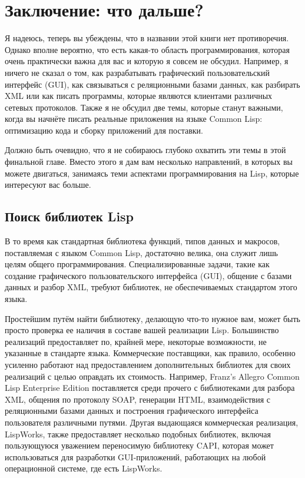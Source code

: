 \chapter{Заключение: что дальше?}
\label{ch:32}

\thispagestyle{empty}

Я надеюсь, теперь вы убеждены, что в названии этой книги нет противоречия.  Однако вполне
вероятно, что есть какая-то область программирования, которая очень практически важна для
вас и которую я совсем не обсудил. Например, я ничего не сказал о том, как разрабатывать
графический пользовательский интерфейс (GUI), как связываться с реляционными базами
данных, как разбирать XML или как писать программы, которые являются клиентами различных
сетевых протоколов. Также я не обсудил две темы, которые станут важными, когда вы начнёте
писать реальные приложения на языке Common Lisp: оптимизацию кода и сборку приложений для
поставки.

Должно быть очевидно, что я не собираюсь глубоко охватить эти темы в этой финальной
главе. Вместо этого я дам вам несколько направлений, в которых вы можете двигаться,
занимаясь теми аспектами программирования на Lisp, которые интересуют вас больше.

\section{Поиск библиотек Lisp}

В то время как стандартная библиотека функций, типов данных и макросов, поставляемая с
языком Common Lisp, достаточно велика, она служит лишь целям общего
программирования. Специализированные задачи, такие как создание графического
пользовательского интерфейса (GUI), общение с базами данных и разбор XML, требуют
библиотек, не обеспечиваемых стандартом этого языка.

Простейшим путём найти библиотеку, делающую что-то нужное вам, может быть просто проверка
ее наличия в составе вашей реализации Lisp. Большинство реализаций предоставляет по,
крайней мере, некоторые возможности, не указанные в стандарте языка. Коммерческие
поставщики, как правило, особенно усиленно работают над предоставлением дополнительных
библиотек для своих реализаций с целью оправдать их стоимость. Например, Franz's Allegro
Common Lisp Enterprise Edition поставляется среди прочего с библиотеками для разбора XML,
общения по протоколу SOAP, генерации HTML, взаимодействия с реляционными базами данных
и построения графического интерфейса пользователя различными путями.  Другая выдающаяся
коммерческая реализация, LispWorks, также предоставляет несколько подобных библиотек,
включая пользующуюся уважением переносимую библиотеку CAPI, которая может использоваться
для разработки GUI-приложений, работающих на любой операционной системе, где есть
LispWorks.

